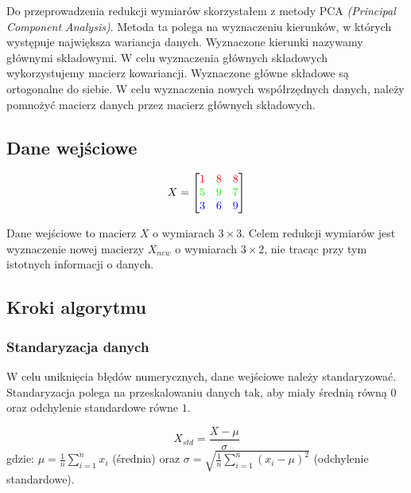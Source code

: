 \documentclass{article}
\begin{document}
Do przeprowadzenia redukcji wymiarów skorzystałem z metody PCA \textit{(Principal Component Analysis)}.
Metoda ta polega na wyznaczeniu kierunków, w których występuje największa wariancja danych.
Wyznaczone kierunki nazywamy głównymi składowymi. W celu wyznaczenia głównych składowych
wykorzystujemy macierz kowariancji. Wyznaczone główne składowe są ortogonalne do siebie.
W celu wyznaczenia nowych współrzędnych danych, należy pomnożyć macierz danych przez
macierz głównych składowych.

\subsection{Dane wejściowe}

\begin{equation}
    X = 
    \begin{bmatrix}
        \textcolor{red}{1} & \textcolor{red}{8} & \textcolor{red}{8} \\
        \textcolor{green}{5} & \textcolor{green}{9} & \textcolor{green}{7} \\
        \textcolor{blue}{3} & \textcolor{blue}{6} & \textcolor{blue}{9} \\
    \end{bmatrix}
\end{equation}

Dane wejściowe to macierz $X$ o wymiarach $3 \times 3$. Celem redukcji wymiarów
jest wyznaczenie nowej macierzy $X_{new}$ o wymiarach $3 \times 2$, nie tracąc
przy tym istotnych informacji o danych.

\subsection{Kroki algorytmu}
\subsubsection*{Standaryzacja danych}

W celu uniknięcia błędów numerycznych, dane wejściowe należy
standaryzować. Standaryzacja polega na przeskalowaniu danych
tak, aby miały średnią równą $0$ oraz odchylenie standardowe
równe $1$.

\begin{equation}
    X_{std} = \frac{X - \mu}{\sigma}
\end{equation}
gdzie: $\mu = \frac{1}{n} \sum_{i=1}^{n} x_i$ (średnia) oraz $\sigma = \sqrt{\frac{1}{n} \sum_{i=1}^{n} (x_i - \mu)^2}$
(odchylenie standardowe).
\end{document}
